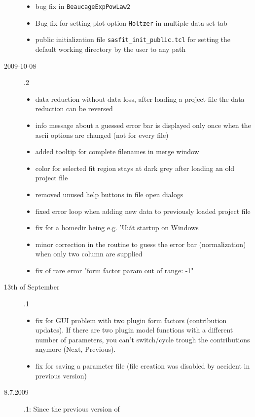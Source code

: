 \begin{description}
\begin{itemize}
        \item bug fix in \texttt{BeaucageExpPowLaw2}
        \item Bug fix for setting plot option
              \texttt{Holtzer} in multiple data set tab
        \item public initialization file \texttt{sasfit\_init\_public.tcl} for setting
              the default working directory by the user to any path
        \end{itemize}
    \item[2009-10-08] .2
        \begin{itemize}
          \item data reduction without data loss, after loading a project file the data reduction can be reversed
          \item info message about a guessed error bar is displayed only once when the ascii options are changed
                (not for every file)
          \item added tooltip for complete filenames in merge window
          \item color for selected fit region stays at dark grey after loading an old project file
          \item removed unused help buttons in file open dialogs
          \item fixed error loop when adding new data to previously loaded project file
          \item fix for a homedir being e.g. 'U:\' at startup on Windows
          \item minor correction in the routine to guess the error bar (normalization) when only two column are supplied
          \item fix of rare error "form factor param out of range: -1"
        \end{itemize}
    \item[13th of September] .1
        \begin{itemize}
          \item fix for GUI problem with two plugin form factors (contribution updates).
                If there are two plugin model functions with a different number of parameters,
                you can't switch/cycle trough the contributions anymore (Next, Previous).
          \item fix for saving a parameter file (file creation was disabled by accident in previous version)
        \end{itemize}
        \item[8.7.2009] .1: Since the previous version of

\end{description}
